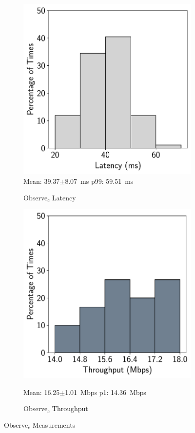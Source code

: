 \begin{figure}[htbp]
    \centering
    \begin{subfigure}[t]{0.45\textwidth}
    \centering
    \includegraphics[width = .8\textwidth]{figs/observe-c-latency.pdf}\\
    \small{Mean: 39.37$\pm$8.07~ms\; p99: 59.51~ms}\\
    \caption{Observe$_{c}$ Latency}
    \label{fig:observe_c_latency}
\end{subfigure}
\begin{subfigure}[t]{0.45\textwidth}
    \centerline{\includegraphics[width = .8\textwidth]{figs/observe-c-throughput.pdf}}
    \centering
    \small{Mean: 16.25$\pm$1.01~Mbps\; p1: 14.36~Mbps}\\
    \caption{Observe$_{c}$ Throughput}
    \label{fig:observe_c_throughput}
\end{subfigure}
    \caption{Observe$_{c}$ Measurements}
    \label{fig:observe_c_measurements}
\end{figure}

